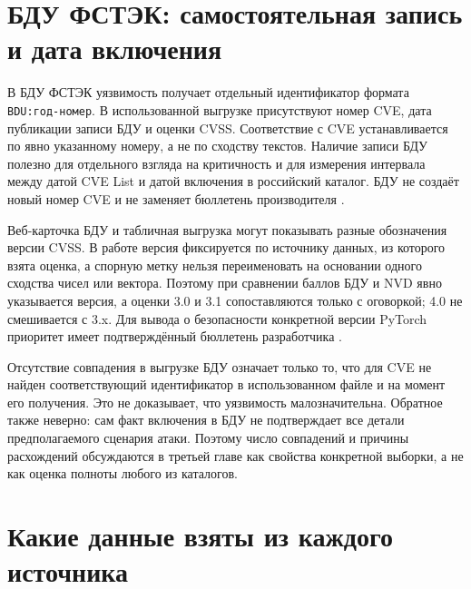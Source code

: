 \documentclass[12pt,a4paper]{report}
\begin{document}
\section{БДУ ФСТЭК: самостоятельная запись и дата включения}

В БДУ ФСТЭК уязвимость получает отдельный идентификатор формата \texttt{BDU:год-номер}. В использованной выгрузке  присутствуют номер CVE, дата публикации записи БДУ и оценки CVSS. Соответствие с CVE устанавливается по явно указанному номеру, а не по сходству текстов. Наличие записи БДУ полезно для отдельного взгляда на критичность и для измерения интервала между датой CVE List и датой включения в российский каталог. БДУ не создаёт новый номер CVE и не заменяет бюллетень производителя \cite{bdu,cve}.

Веб-карточка БДУ и табличная выгрузка могут показывать разные обозначения версии CVSS. В работе версия фиксируется по источнику данных, из которого взята оценка, а спорную метку нельзя переименовать на основании одного сходства чисел или вектора. Поэтому при сравнении баллов БДУ и NVD явно указывается версия, а оценки 3.0 и 3.1 сопоставляются только с оговоркой; 4.0 не смешивается с 3.x. Для вывода о безопасности конкретной версии PyTorch приоритет имеет подтверждённый бюллетень разработчика \cite{bdu,ghsa}.

Отсутствие совпадения в выгрузке БДУ означает только то, что для CVE не найден соответствующий идентификатор в использованном файле и на момент его получения. Это не доказывает, что уязвимость малозначительна. Обратное также неверно: сам факт включения в БДУ не подтверждает все детали предполагаемого сценария атаки. Поэтому число совпадений и причины расхождений обсуждаются в третьей главе как свойства конкретной выборки, а не как оценка полноты любого из каталогов.

\section{Какие данные взяты из каждого источника}
\end{document}
